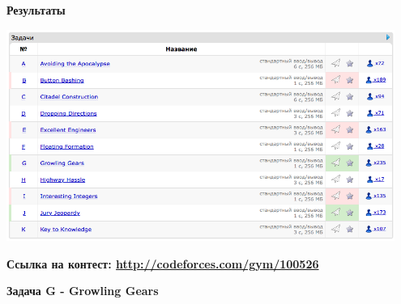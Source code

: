 \documentclass[a4paper,12pt]{article}
\begin{document}
\textbf{{\large Результаты}} \\
\begin{center}
\includegraphics[width=0.95\textwidth]{CT_S02E08/CT_S02E08_result.png}\\ [1cm]
\end{center}

\textbf{{\large Ссылка на контест: \url{http://codeforces.com/gym/100526}}}

\newpage
\textbf{{\large Задача G - Growling Gears}}
\end{document}
